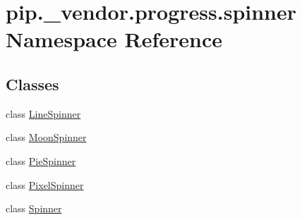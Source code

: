 \hypertarget{namespacepip_1_1__vendor_1_1progress_1_1spinner}{}\section{pip.\+\_\+vendor.\+progress.\+spinner Namespace Reference}
\label{namespacepip_1_1__vendor_1_1progress_1_1spinner}
\subsection*{Classes}
\begin{DoxyCompactItemize}
\item 
class \hyperlink{classpip_1_1__vendor_1_1progress_1_1spinner_1_1LineSpinner}{Line\+Spinner}
\item 
class \hyperlink{classpip_1_1__vendor_1_1progress_1_1spinner_1_1MoonSpinner}{Moon\+Spinner}
\item 
class \hyperlink{classpip_1_1__vendor_1_1progress_1_1spinner_1_1PieSpinner}{Pie\+Spinner}
\item 
class \hyperlink{classpip_1_1__vendor_1_1progress_1_1spinner_1_1PixelSpinner}{Pixel\+Spinner}
\item 
class \hyperlink{classpip_1_1__vendor_1_1progress_1_1spinner_1_1Spinner}{Spinner}
\end{DoxyCompactItemize}
